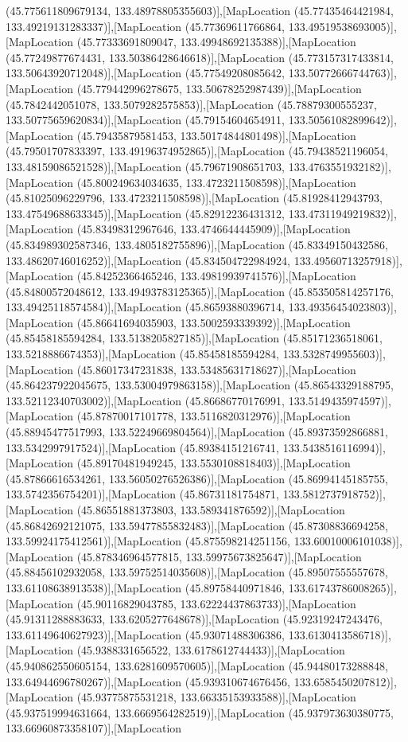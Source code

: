 (45.775611809679134, 133.48978805355603)],[MapLocation (45.77435464421984, 133.49219131283337)],[MapLocation (45.77369611766864, 133.49519538693005)],[MapLocation (45.77333691809047, 133.49948692135388)],[MapLocation (45.77249877674431, 133.50386428646618)],[MapLocation (45.773157317433814, 133.50643920712048)],[MapLocation (45.77549208085642, 133.50772666744763)],[MapLocation (45.779442996278675, 133.50678252987439)],[MapLocation (45.7842442051078, 133.5079282575853)],[MapLocation (45.78879300555237, 133.50775659620834)],[MapLocation (45.79154604654911, 133.50561082899642)],[MapLocation (45.79435879581453, 133.50174844801498)],[MapLocation (45.79501707833397, 133.49196374952865)],[MapLocation (45.79438521196054, 133.48159086521528)],[MapLocation (45.79671908651703, 133.4763551932182)],[MapLocation (45.800249634034635, 133.4723211508598)],[MapLocation (45.81025096229796, 133.4723211508598)],[MapLocation (45.81928412943793, 133.47549688633345)],[MapLocation (45.82912236431312, 133.47311949219832)],[MapLocation (45.83498312967646, 133.4746644445909)],[MapLocation (45.834989302587346, 133.4805182755896)],[MapLocation (45.83349150432586, 133.48620746016252)],[MapLocation (45.834504722984924, 133.49560713257918)],[MapLocation (45.84252366465246, 133.49819939741576)],[MapLocation (45.84800572048612, 133.49493783125365)],[MapLocation (45.853505814257176, 133.49425118574584)],[MapLocation (45.86593880396714, 133.49356454023803)],[MapLocation (45.86641694035903, 133.5002593339392)],[MapLocation (45.85458185594284, 133.5138205827185)],[MapLocation (45.85171236518061, 133.5218886674353)],[MapLocation (45.85458185594284, 133.5328749955603)],[MapLocation (45.86017347231838, 133.53485631718627)],[MapLocation (45.864237922045675, 133.53004979863158)],[MapLocation (45.86543329188795, 133.52112340703002)],[MapLocation (45.86686770176991, 133.5149435974597)],[MapLocation (45.87870017101778, 133.5116820312976)],[MapLocation (45.88945477517993, 133.52249669804564)],[MapLocation (45.89373592866881, 133.5342997917524)],[MapLocation (45.89384151216741, 133.5438516116994)],[MapLocation (45.89170481949245, 133.5530108818403)],[MapLocation (45.87866616534261, 133.56050276526386)],[MapLocation (45.86994145185755, 133.5742356754201)],[MapLocation (45.86731181754871, 133.5812737918752)],[MapLocation (45.86551881373803, 133.589341876592)],[MapLocation (45.86842692121075, 133.59477855832483)],[MapLocation (45.87308836694258, 133.59924175412561)],[MapLocation (45.875598214251156, 133.60010006101038)],[MapLocation (45.878346964577815, 133.59975673825647)],[MapLocation (45.88456102932058, 133.59752514035608)],[MapLocation (45.89507555557678, 133.61108638913538)],[MapLocation (45.89758440971846, 133.61743786008265)],[MapLocation (45.90116829043785, 133.62224437863733)],[MapLocation (45.91311288883633, 133.6205277648678)],[MapLocation (45.92319247243476, 133.61149640627923)],[MapLocation (45.93071488306386, 133.6130413586718)],[MapLocation (45.9388331656522, 133.6178612744433)],[MapLocation (45.940862550605154, 133.6281609570605)],[MapLocation (45.94480173288848, 133.64944696780267)],[MapLocation (45.939310674676456, 133.6585450207812)],[MapLocation (45.93775875531218, 133.66335153933588)],[MapLocation (45.937519994631664, 133.6669564282519)],[MapLocation (45.937973630380775, 133.66960873358107)],[MapLocation 